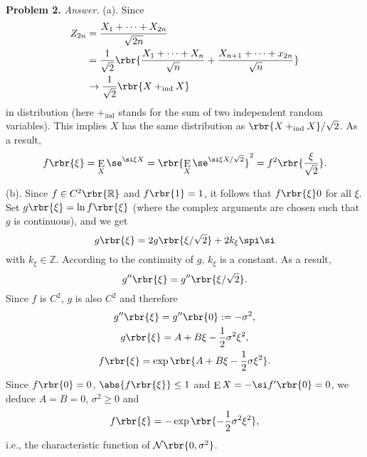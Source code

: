 \documentclass[english, nochinese]{pnote}
\DeclareMathOperator\ope{\mathrm{E}}
\begin{document}
\textbf{Problem 2.} \textit{Answer.} (a). Since
\begin{equation}
\begin{split}
Z_{ 2 n } &= \frac{ X_1 + \cdots + X_{ 2 n } }{\sqrt{ 2 n }} \\
&= \frac{1}{\sqrt{2}} \rbr{ \frac{ X_1 + \cdots + X_n }{\sqrt{n}} + \frac{ X_{ n + 1 } + \cdots + x_{ 2 n } }{\sqrt{n}} } \\
&\rightarrow \frac{1}{\sqrt{2}} \rbr{ X +_{\text{ind}} X }
\end{split}
\end{equation}
in distribution (here $+_{\text{ind}}$ stands for the sum of two independent random variables). This implies $X$ has the same distribution as $ \rbr{ X +_{\text{ind}} X } / \sqrt{2} $. As a result,
\begin{equation}
f \rbr{\xi} = \ope_X \se^{ \si \xi X } = \rbr{ \ope_X \se^{ \si \xi X / \sqrt{2} } }^2 = f^2 \rbr{\frac{\xi}{\sqrt{2}}}.
\end{equation}

(b). Since $ f \in C^2 \rbr{\mathbb{R}} $ and $ f \rbr{1} = 1 $, it follows that $ f \rbr{\xi} 0 $ for all $\xi$. Set $ g \rbr{\xi} = \ln f \rbr{\xi} $ (where the complex arguments are chosen such that $g$ is continuous), and we get
\begin{equation}
g \rbr{\xi} = 2 g \rbr{ \xi / \sqrt{2} } + 2 k_{\xi} \spi \si
\end{equation}
with $ k_{\xi} \in \mathbb{Z} $. According to the continuity of $g$, $k_{\xi}$ is a constant. As a result,  
\begin{equation}
g'' \rbr{\xi} = g'' \rbr{ \xi / \sqrt{2} }.
\end{equation}
Since $f$ is $C^2$, $g$ is also $C^2$ and therefore
\begin{gather}
g'' \rbr{\xi} = g'' \rbr{0} := -\sigma^2, \\
g \rbr{\xi} = A + B \xi - \frac{1}{2} \sigma^2 \xi^2, \\
f \rbr{\xi} = \exp \rbr{ A + B \xi - \frac{1}{2} \sigma \xi^2 }.
\end{gather}
Since $ f \rbr{0} = 0 $, $ \abs{ f \rbr{\xi} } \le 1 $ and $ \ope X = -\si f' \rbr{0} = 0 $, we deduce $ A = B = 0 $, $ \sigma^2 \ge 0 $ and
\begin{equation}
f \rbr{\xi} = -\exp \rbr{ -\frac{1}{2} \sigma^2 \xi^2 },
\end{equation}
i.e., the characteristic function of $ \mathcal{N} \rbr{ 0, \sigma^2 } $.
\end{document}
